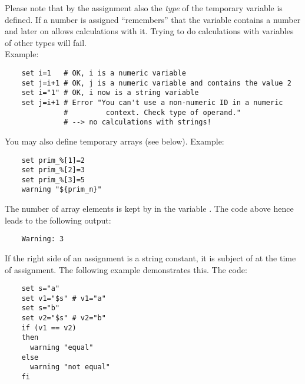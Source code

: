     Please note that by the assignment also the \emph{type} of the temporary variable
    is defined. If a number is assigned   ``remembers'' that the variable
    contains a number and later on allows calculations with it. Trying to do
    calculations with variables of other types will fail.\\ Example:

\begin{example}
\begin{verbatim}
    set i=1   # OK, i is a numeric variable
    set j=i+1 # OK, j is a numeric variable and contains the value 2
    set i="1" # OK, i now is a string variable
    set j=i+1 # Error "You can't use a non-numeric ID in a numeric
              #         context. Check type of operand."
              # --> no calculations with strings!
\end{verbatim}
\end{example}

    You may also define temporary arrays (see below). Example:

\begin{example}
\begin{verbatim}
    set prim_%[1]=2
    set prim_%[2]=3
    set prim_%[3]=5
    warning "${prim_n}"
\end{verbatim}
\end{example}

    The number of array elements is kept by  in the variable
    . The code above hence leads to the following output:

\begin{example}
\begin{verbatim}
    Warning: 3
\end{verbatim}
\end{example}

    If the right side of an assignment is a string constant, it is subject of
     at the time of
    assignment. The following example demonstrates this. The code:

\begin{example}
\begin{verbatim}
    set s="a"
    set v1="$s" # v1="a"
    set s="b"
    set v2="$s" # v2="b"
    if (v1 == v2)
    then
      warning "equal"
    else
      warning "not equal"
    fi
\end{verbatim}
\end{example}

